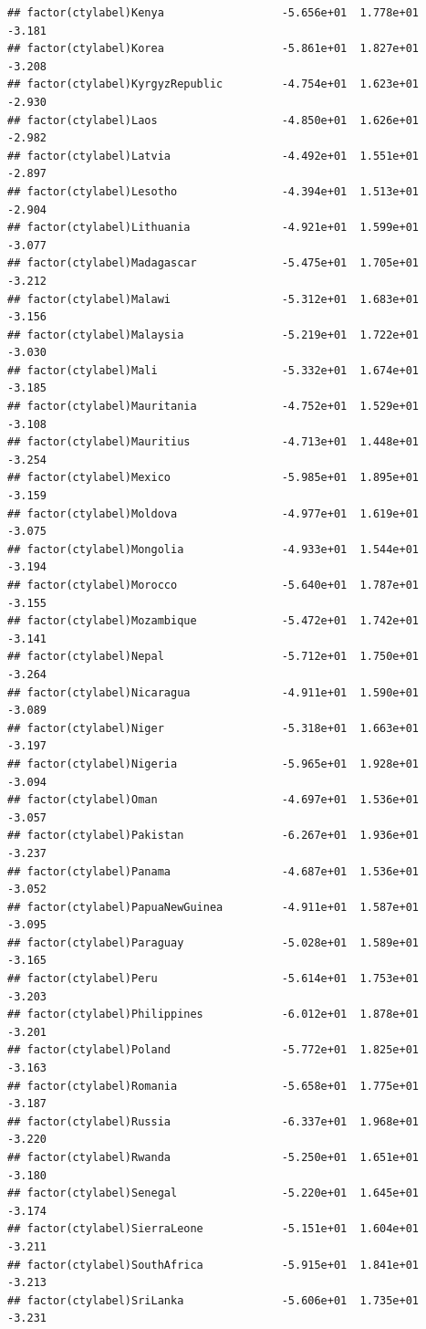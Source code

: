 \documentclass[12pt]{article}\usepackage[]{graphicx}\usepackage[]{color}
\makeatletter
\newenvironment{kframe}{%
 \def\at@end@of@kframe{}%
 \ifinner\ifhmode%
  \def\at@end@of@kframe{\end{minipage}}%
  \begin{minipage}{\columnwidth}%
 \fi\fi%
 \def\FrameCommand##1{\hskip\@totalleftmargin \hskip-\fboxsep
 \colorbox{shadecolor}{##1}\hskip-\fboxsep
     \hskip-\linewidth \hskip-\@totalleftmargin \hskip\columnwidth}%
 \MakeFramed {\advance\hsize-\width
   \@totalleftmargin\z@ \linewidth\hsize
   \@setminipage}}%
 {\par\unskip\endMakeFramed%
 \at@end@of@kframe}
\newenvironment{knitrout}{}{} %
\makeatother
\begin{document}
\begin{knitrout}
\begin{kframe}
\begin{verbatim}
## factor(ctylabel)Kenya                  -5.656e+01  1.778e+01  -3.181
## factor(ctylabel)Korea                  -5.861e+01  1.827e+01  -3.208
## factor(ctylabel)KyrgyzRepublic         -4.754e+01  1.623e+01  -2.930
## factor(ctylabel)Laos                   -4.850e+01  1.626e+01  -2.982
## factor(ctylabel)Latvia                 -4.492e+01  1.551e+01  -2.897
## factor(ctylabel)Lesotho                -4.394e+01  1.513e+01  -2.904
## factor(ctylabel)Lithuania              -4.921e+01  1.599e+01  -3.077
## factor(ctylabel)Madagascar             -5.475e+01  1.705e+01  -3.212
## factor(ctylabel)Malawi                 -5.312e+01  1.683e+01  -3.156
## factor(ctylabel)Malaysia               -5.219e+01  1.722e+01  -3.030
## factor(ctylabel)Mali                   -5.332e+01  1.674e+01  -3.185
## factor(ctylabel)Mauritania             -4.752e+01  1.529e+01  -3.108
## factor(ctylabel)Mauritius              -4.713e+01  1.448e+01  -3.254
## factor(ctylabel)Mexico                 -5.985e+01  1.895e+01  -3.159
## factor(ctylabel)Moldova                -4.977e+01  1.619e+01  -3.075
## factor(ctylabel)Mongolia               -4.933e+01  1.544e+01  -3.194
## factor(ctylabel)Morocco                -5.640e+01  1.787e+01  -3.155
## factor(ctylabel)Mozambique             -5.472e+01  1.742e+01  -3.141
## factor(ctylabel)Nepal                  -5.712e+01  1.750e+01  -3.264
## factor(ctylabel)Nicaragua              -4.911e+01  1.590e+01  -3.089
## factor(ctylabel)Niger                  -5.318e+01  1.663e+01  -3.197
## factor(ctylabel)Nigeria                -5.965e+01  1.928e+01  -3.094
## factor(ctylabel)Oman                   -4.697e+01  1.536e+01  -3.057
## factor(ctylabel)Pakistan               -6.267e+01  1.936e+01  -3.237
## factor(ctylabel)Panama                 -4.687e+01  1.536e+01  -3.052
## factor(ctylabel)PapuaNewGuinea         -4.911e+01  1.587e+01  -3.095
## factor(ctylabel)Paraguay               -5.028e+01  1.589e+01  -3.165
## factor(ctylabel)Peru                   -5.614e+01  1.753e+01  -3.203
## factor(ctylabel)Philippines            -6.012e+01  1.878e+01  -3.201
## factor(ctylabel)Poland                 -5.772e+01  1.825e+01  -3.163
## factor(ctylabel)Romania                -5.658e+01  1.775e+01  -3.187
## factor(ctylabel)Russia                 -6.337e+01  1.968e+01  -3.220
## factor(ctylabel)Rwanda                 -5.250e+01  1.651e+01  -3.180
## factor(ctylabel)Senegal                -5.220e+01  1.645e+01  -3.174
## factor(ctylabel)SierraLeone            -5.151e+01  1.604e+01  -3.211
## factor(ctylabel)SouthAfrica            -5.915e+01  1.841e+01  -3.213
## factor(ctylabel)SriLanka               -5.606e+01  1.735e+01  -3.231

\end{verbatim}
\end{kframe}
\end{knitrout}
\end{document}
